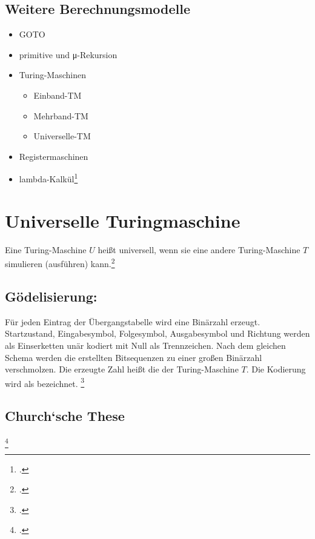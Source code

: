 \documentclass{bschlangaul-theorie}
\begin{document}
\subsection{Weitere Berechnungsmodelle}

\begin{itemize}
\item GOTO
\item primitive und μ-Rekursion

\item Turing-Maschinen
\begin{itemize}
\item Einband-TM
\item Mehrband-TM
\item Universelle-TM
\end{itemize}

\item Registermaschinen
\item lambda-Kalkül\footcite[Seite 17]{theo:fs:4}
\end{itemize}

%

\section{Universelle Turingmaschine}


Eine Turing-Maschine $U$ heißt universell, wenn sie eine andere
Turing-Maschine $T$ simulieren (ausführen) kann.\footcite[Seite
23]{theo:fs:4}

\subsection{Gödelisierung:}

Für jeden Eintrag der Übergangstabelle wird eine Binärzahl erzeugt.
Startzustand, Eingabesymbol, Folgesymbol, Ausgabesymbol und Richtung
werden als Einserketten unär kodiert mit Null als Trennzeichen. Nach dem
gleichen Schema werden die erstellten Bitsequenzen zu einer großen
Binärzahl verschmolzen. Die erzeugte Zahl heißt die 
der Turing-Maschine $T$. Die Kodierung wird als 
bezeichnet.
\footcite[Seite 23]{theo:fs:4}

\subsection{Church‘sche These}
\footcite{wiki:church-these}
\end{document}
